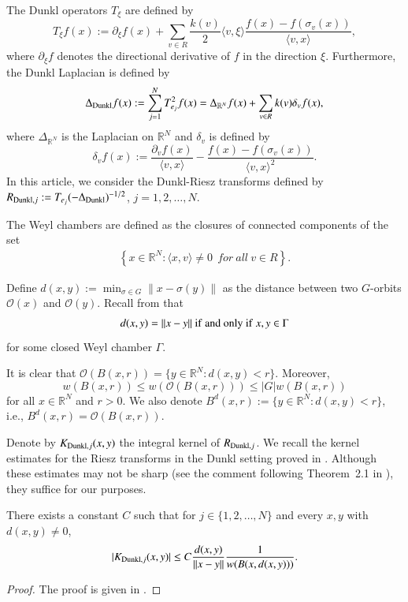 \documentclass[12pt]{amsart}
\begin{document}
The Dunkl operators $T_\xi$ are defined by
$$T_\xi f(x):=\partial_\xi f(x)+\sum_{v\in R}\frac{k(v)}{2}\langle v,\xi\rangle\frac{f(x)-f(\sigma_v(x))}{\langle v,x\rangle},$$
where $\partial_\xi f$ denotes the directional derivative of $f$ in the direction $\xi$. Furthermore, the Dunkl Laplacian is defined by $$\Delta_{{\rm Dunkl}}f(x):=\sum_{j=1}^N T_{e_j}^2f(x)=\Delta_{\mathbb{R}^N}f(x)+\sum_{v\in R}k(v)\delta_v f(x),$$
where $\Delta_{\mathbb{R}^N}$ is the Laplacian on $\mathbb{R}^N$ and $\delta_v$ is defined by
$$\delta_v f(x):=\frac{\partial_v f(x)}{\langle v,x\rangle}-\frac{f(x)-f(\sigma_v(x))}{\langle v,x\rangle^2}.$$
In this article, we consider the Dunkl-Riesz transforms defined by $R_{{\rm Dunkl},j}:=T_{e_j}(-\Delta_{{\rm Dunkl}})^{-1/2}$, $j=1,2,\ldots,N$.


\begin{definition}{\rm
The Weyl chambers are defined as the closures of connected components of the set
  \begin{align}
    \left\{x\in\mathbb{R}^N:\langle x,v\rangle \neq 0\ \ { for} \ { all} \ v\in R\right\}.\end{align}}
\end{definition}
Define $
	d(x,y):=\min_{\sigma\in G}\|x-\sigma(y)\|
$
as the distance between two $G$-orbits $\mathcal O(x)$ and $\mathcal O(y)$. Recall from \cite[Chapter VII, proof of Theorem 2.12]{MR514561} that
\begin{align}\label{distanceequa}
d(x,y)=\|x-y\|\ {\rm if}\ {\rm and}\ {\rm only}\ {\rm if}\ x,y\in\Gamma
\end{align}
for some closed Weyl chamber $\Gamma$.

It is clear that $\mathcal O(B(x,r)) = \{y\in \mathbb{R}^N: d(x,y)<r\}$. Moreover,
\[
w(B(x,r)) \leq w(\mathcal O(B(x,r))) \leq |G|w(B(x,r))
\]
for all $x \in \mathbb{R}^N$ and $r>0$. We also denote $B^d(x,r):= \{y\in \mathbb{R}^N: d(x,y)<r\}$, i.e., $B^d(x,r)=\mathcal O(B(x,r))$.

Denote by $K_{{\rm Dunkl},j}(x,y)$ the integral kernel of $R_{{\rm Dunkl},j}$. We recall the kernel estimates for the Riesz transforms in the Dunkl setting proved in \cite{MR4733961}. Although these estimates may not be sharp (see the comment following Theorem~2.1 in \cite[p.~10]{MR4733961}), they suffice for our purposes.
\begin{lemma}\label{kernelestimate}
There exists a constant $C$ such that for $j\in\{1,2,\ldots,N\}$ and every $x,y$ with $d(x,y)\neq 0$,
\begin{align*}
|K_{{\rm Dunkl},j}(x,y)|\leq C\frac{d(x,y)}{\|x-y\|}\frac{1}{w(B(x,d(x,y)))}.
\end{align*}
\end{lemma}
\begin{proof}
The proof is given in \cite[Theorem 1.1]{MR4733961}.
\end{proof}
\end{document}
